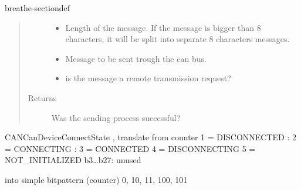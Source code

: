 \documentclass[a4paper,10pt,english]{sphinxmanual}
\begin{document}
\begin{fulllineitems}
\begin{sphinxuseclass}{breathe-sectiondef}
\begin{fulllineitems}
\begin{quote}
\begin{description}
\begin{itemize}
\item {} 
\sphinxAtStartPar
{} \textendash{} Length of the message. If the message is bigger than 8 characters, it will be split into separate 8 characters messages. 

\item {} 
\sphinxAtStartPar
{} \textendash{} Message to be sent trough the can bus. 

\item {} 
\sphinxAtStartPar
{} \textendash{} is the message a remote transmission request? 

\end{itemize}

\item[{Returns}] \leavevmode
\sphinxAtStartPar
Was the sending process successful? 

\end{description}\end{quote}

\end{fulllineitems}


\begin{fulllineitems}
\label{\detokenize{classestracing:_CPPv4N10AnaCanScan13getPortStatusEv}}%
\pysigstartmultiline
{}%
\pysigstopmultiline
\sphinxAtStartPar
CANCanDeviceConnectState , translate from counter 1 = DISCONNECTED : 2 = CONNECTING : 3 = CONNECTED 4 = DISCONNECTING 5 = NOT\_INITIALIZED b3…b27: unused

\sphinxAtStartPar
into simple bitpattern (counter) 0, 10, 11, 100, 101 

\end{fulllineitems}


\end{sphinxuseclass}
\end{fulllineitems}

\end{document}

